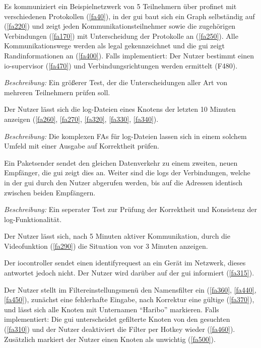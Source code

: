 \begin{description}[style=multiline, leftmargin=4cm, labelwidth=4cm]
   Es kommuniziert ein Beispielnetzwerk von 5 Teilnehmern über \gls{profinet} mit verschiedenen Protokollen (\ref{fa40}), in der \gls{gui} baut sich ein Graph selbständig auf (\ref{fa220}) und zeigt jeden Kommunikationsteilnehmer sowie die zugehörigen Verbindungen (\ref{fa170}) mit Unterscheidung der Protokolle an (\ref{fa250}). Alle Kommunikationswege werden als legal gekennzeichnet und die \gls{gui} zeigt Randinformationen an (\ref{fa400}). Falls implementiert: Der Nutzer bestimmt einen \gls{io-supervisor} (\ref{fa470}) und Verbindungsrichtungen werden ermittelt (F480). \par
      \textit{Beschreibung:} Ein größerer Test, der die Unterscheidungen aller Art von mehreren Teilnehmern prüfen soll.

   Der Nutzer lässt sich die \gls{log}-Dateien eines Knotens der letzten 10 Minuten anzeigen (\ref{fa260}, \ref{fa270}, \ref{fa320}, \ref{fa330}, \ref{fa340}). \par
      \textit{Beschreibung:} Die komplexen FAs für \gls{log}-Dateien lassen sich in einem solchem Umfeld mit einer Ausgabe auf Korrektheit prüfen.

   Ein Paketsender sendet den gleichen Datenverkehr zu einem zweiten, neuen Empfänger, die \gls{gui} zeigt dies an. Weiter sind die \glspl{log} der Verbindungen, welche in der \gls{gui} durch den Nutzer abgerufen werden, bis auf die Adressen identisch zwischen beiden Empfängern. \par
      \textit{Beschreibung:} Ein seperater Test zur Prüfung der Korrektheit und Konsistenz der \gls{log}-Funktionalität.

   Der Nutzer lässt sich, nach 5 Minuten aktiver Kommunikation, durch die Videofunktion (\ref{fa290}) die Situation von vor 3 Minuten anzeigen.

   Der \gls{iocontroller} sendet einen \gls{identifyrequest} an ein Gerät im Netzwerk, dieses antwortet jedoch nicht. Der Nutzer wird darüber auf der \gls{gui} informiert (\ref{fa315}).

   Der Nutzer stellt im Filtereinstellungsmenü den Namensfilter ein (\ref{fa360}, \ref{fa440}, \ref{fa450}), zunächst eine fehlerhafte Eingabe, nach Korrektur eine gültige (\ref{fa370}), und lässt sich alle Knoten mit Unternamen “Haribo” markieren. Falls implementiert: Die \gls{gui} unterscheidet gefilterte Knoten von den gesuchten (\ref{fa310}) und der Nutzer deaktiviert die Filter per Hotkey wieder (\ref{fa460}). Zusätzlich markiert der Nutzer einen Knoten als unwichtig (\ref{fa500}).


\end{description}
